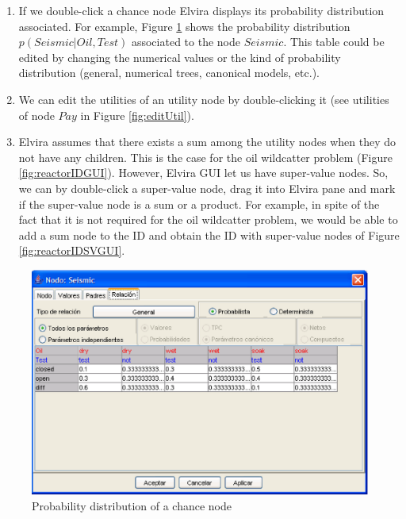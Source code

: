 \begin{enumerate}
\item If we double-click a chance node Elvira displays its probability
distribution associated. For example, Figure \ref{fig:editProb} shows the
probability distribution $p(Seismic|Oil,Test)$ associated to the node $%
Seismic.$ This table could be edited by changing the numerical values or the
kind of probability distribution (general, numerical trees, canonical
models, etc.).

\item We can edit the utilities of an utility node by double-clicking it
(see utilities of node $Pay$ in Figure \ref{fig:editUtil}).

\item Elvira assumes that there exists a sum among the utility nodes when
they do not have any children. This is the case for the oil wildcatter
problem (Figure \ref{fig:reactorIDGUI}). However, Elvira GUI let us have
super-value nodes. So, we can by double-click a super-value node, drag it
into Elvira pane and mark if the super-value node is a sum or a product. For
example, in spite of the fact that it is not required for the oil wildcatter
problem, we would be able to add a sum node to the ID and obtain the ID with
super-value nodes of Figure \ref{fig:reactorIDSVGUI}.
\end{enumerate}

\begin{figure}[h]
\begin{center}
\includegraphics[scale=0.3]{./ID/fig/editProb.eps} \vspace{-0.5cm}
\end{center}
\caption{Probability distribution of a chance node}
\label{fig:editProb}
\end{figure}


